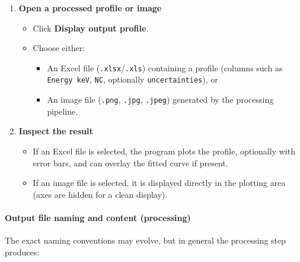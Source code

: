 \begin{enumerate}
\def\labelenumi{\arabic{enumi}.}
\tightlist
\item
  \textbf{Open a processed profile or image}

  \begin{itemize}
  \tightlist
  \item
    Click \textbf{Display output profile}.\\
  \item
    Choose either:

    \begin{itemize}
    \tightlist
    \item
      An Excel file (\texttt{.xlsx}/\texttt{.xls}) containing a profile
      (columns such as \texttt{Energy\ keV}, \texttt{NC}, optionally
      \texttt{uncertainties}), or\\
    \item
      An image file (\texttt{.png}, \texttt{.jpg}, \texttt{.jpeg})
      generated by the processing pipeline.
    \end{itemize}
  \end{itemize}
\item
  \textbf{Inspect the result}

  \begin{itemize}
  \tightlist
  \item
    If an Excel file is selected, the program plots the profile,
    optionally with error bars, and can overlay the fitted curve if
    present.\\
  \item
    If an image file is selected, it is displayed directly in the
    plotting area (axes are hidden for a clean display).
  \end{itemize}
\end{enumerate}

\hypertarget{output-file-naming-and-content-processing}{%
\paragraph{Output file naming and content
(processing)}\label{output-file-naming-and-content-processing}}

The exact naming conventions may evolve, but in general the processing
step produces:

